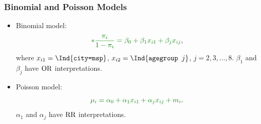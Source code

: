 \documentclass[oneside]{book}\usepackage[]{graphicx}\usepackage[svgnames]{xcolor}
\let\log\relax%
\newcommand{\OR}{\text{OR}}%
\newcommand{\RR}{\text{RR}}%
\begin{document}
\subsubsection*{Binomial and Poisson Models}
\begin{itemize}
    \item Binomial model:
          \[ \textcolor{Green}{\log*{\frac{\pi_i}{1-\pi_i}}=\beta_0+\beta_1x_{i1}+\beta_jx_{ij}}, \]
          where $ x_{i1}=\Ind{\texttt{city=msp}} $, $ x_{i2}=\Ind{\texttt{agegroup }j} $, $ j=2,3,\ldots,8 $. $ \beta_1 $ and $ \beta_j $
          have $ \log{\OR} $ interpretations.
    \item Poisson model:
          \[ \textcolor{Green}{\log{\mu_i}=\alpha_0+\alpha_1x_{i1}+\alpha_jx_{ij}+\log{m_i}}. \]
          $ \alpha_1 $ and $ \alpha_j $ have $ \log{\RR} $ interpretations.
\end{itemize}
\end{document}
